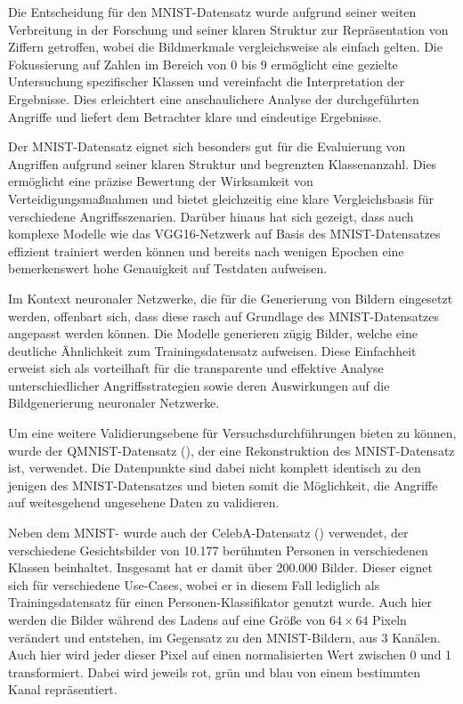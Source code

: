 Die Entscheidung für den MNIST-Datensatz wurde aufgrund seiner weiten Verbreitung in der Forschung und seiner klaren Struktur zur Repräsentation von Ziffern getroffen, wobei die Bildmerkmale vergleichsweise als \glqq einfach\grqq{} gelten. Die Fokussierung auf Zahlen im Bereich von 0 bis 9 ermöglicht eine gezielte Untersuchung spezifischer Klassen und vereinfacht die Interpretation der Ergebnisse. Dies erleichtert eine anschaulichere Analyse der durchgeführten Angriffe und liefert dem Betrachter klare und eindeutige Ergebnisse.

Der MNIST-Datensatz eignet sich besonders gut für die Evaluierung von Angriffen aufgrund seiner klaren Struktur und begrenzten Klassenanzahl. Dies ermöglicht eine präzise Bewertung der Wirksamkeit von Verteidigungsmaßnahmen und bietet gleichzeitig eine klare Vergleichsbasis für verschiedene Angriffsszenarien. Darüber hinaus hat sich gezeigt, dass auch komplexe Modelle wie das VGG16-Netzwerk auf Basis des MNIST-Datensatzes effizient trainiert werden können und bereits nach wenigen Epochen eine bemerkenswert hohe Genauigkeit auf Testdaten aufweisen.

Im Kontext neuronaler Netzwerke, die für die Generierung von Bildern eingesetzt werden, offenbart sich, dass diese rasch auf Grundlage des MNIST-Datensatzes angepasst werden können. Die Modelle generieren zügig Bilder, welche eine deutliche Ähnlichkeit zum Trainingsdatensatz aufweisen. Diese \glqq Einfachheit\grqq{} erweist sich als vorteilhaft für die transparente und effektive Analyse unterschiedlicher Angriffsstrategien sowie deren Auswirkungen auf die Bildgenerierung neuronaler Netzwerke.

Um eine weitere Validierungsebene für Versuchsdurchführungen bieten zu können, wurde der QMNIST-Datensatz (\cite{yadav_cold_2019}), der eine Rekonstruktion des MNIST-Datensatz ist, verwendet. Die Datenpunkte sind dabei nicht komplett identisch zu den jenigen des MNIST-Datensatzes und bieten somit die Möglichkeit, die Angriffe auf weitesgehend ungesehene Daten zu validieren.

Neben dem MNIST- wurde auch der CelebA-Datensatz (\cite{noauthor_celeba_nodate}) verwendet, der verschiedene Gesichtsbilder von 10.177 berühmten Personen in verschiedenen Klassen beinhaltet. Insgesamt hat er damit über 200.000 Bilder. Dieser eignet sich für verschiedene Use-Cases, wobei er in diesem Fall lediglich als Trainingsdatensatz für einen \glqq Personen\grqq-Klassifikator genutzt wurde. Auch hier werden die Bilder während des Ladens auf eine Größe von $64 \times 64$ Pixeln verändert und entstehen, im Gegensatz zu den MNIST-Bildern, aus 3 Kanälen. Auch hier wird jeder dieser Pixel auf einen normalisierten Wert zwischen 0 und 1 transformiert. Dabei wird jeweils rot, grün und blau von einem bestimmten Kanal repräsentiert. 


